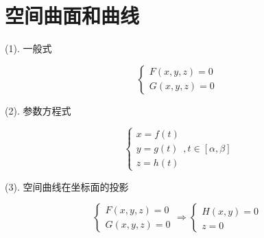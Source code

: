 \section{空间曲面和曲线}

\begin{definition}[空间曲面] 
	(1). 一般式
	
	$$\begin{cases}
		F(x,y,z) = 0 \\
		G(x,y,z) = 0
	\end{cases}$$
	
	(2). 参数方程式
	
	$$\begin{cases}
		x = f(t)\\
		y = g(t)\\
		z = h(t)
	\end{cases},  t\in[\alpha,\beta]$$
	
	(3). 空间曲线在坐标面的投影
	
	$$\begin{cases}
		F(x,y,z) = 0\\
		G(x,y,z) = 0
	\end{cases}\Rightarrow
	\begin{cases}
		H(x,y) = 0\\
		z = 0
	\end{cases}$$
\end{definition}


